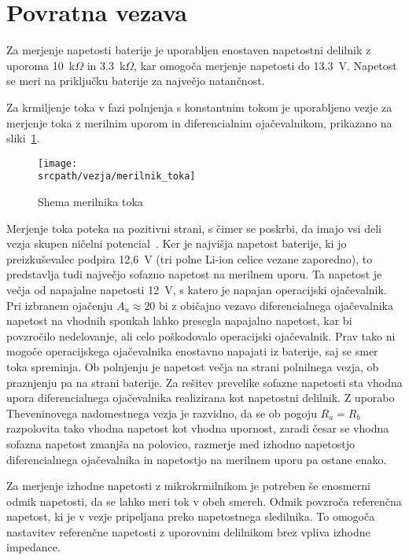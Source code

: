 \documentclass[a4paper,twoside,openright,12pt,slovene]{book}
\newcommand{\srcpath}{res_dark}
\newcommand{\srcpath}{res}
\begin{document}
\section{Povratna vezava} \label{sec:povratna vezava}

Za merjenje napetosti baterije je uporabljen enostaven napetostni delilnik z uporoma 10~k$\Omega$ in 3.3~k$\Omega$, kar omogoča merjenje napetosti do 13.3~V.\@
Napetost se meri na priključku baterije za največjo natančnost.

Za krmiljenje toka v fazi polnjenja s konstantnim tokom je uporabljeno vezje za merjenje toka z merilnim uporom in diferencialnim ojačevalnikom, prikazano na sliki~\ref{fig:merilnik_toka}.
\begin{figure}[H]
    \centering
    \texttt{[image: \\srcpath/vezja/merilnik\_toka]}
    \caption{\label{fig:merilnik_toka} Shema merilnika toka}
\end{figure}

Merjenje toka poteka na pozitivni strani, s čimer se poskrbi, da imajo vsi deli vezja skupen ničelni potencial~\cite{claycomb_using_2019}.
Ker je najvišja napetost baterije, ki jo preizkuševalec podpira 12,6~V (tri polne Li-ion celice vezane zaporedno), to predstavlja tudi največjo sofazno napetost na merilnem uporu.
Ta napetost je večja od napajalne napetosti 12~V, s katero je napajan operacijski ojačevalnik.
Pri izbranem ojačenju $A_u \approx 20$ bi z običajno vezavo diferencialnega ojačevalnika napetost na vhodnih sponkah
lahko presegla napajalno napetost, kar bi povzročilo nedelovanje, ali celo poškodovalo operacijski ojačevalnik.
Prav tako ni mogoče operacijskega ojačevalnika enostavno napajati iz baterije, saj se smer toka spreminja.
Ob polnjenju je napetost večja na strani polnilnega vezja, ob praznjenju pa na strani baterije.
Za rešitev prevelike sofazne napetosti sta vhodna upora diferencialnega ojačevalnika realizirana kot napetostni delilnik.
Z uporabo Theveninovega nadomestnega vezja je razvidno, da se ob pogoju $R_a=R_b$ razpolovita tako vhodna napetost kot vhodna upornost,
zaradi česar se vhodna sofazna napetost zmanjša na polovico, razmerje med izhodno napetostjo diferencialnega ojačevalnika in napetostjo na merilnem uporu pa ostane enako.

Za merjenje izhodne napetosti z mikrokrmilnikom je potreben še enosmerni odmik napetosti, da se lahko meri tok v obeh smereh.
Odmik povzroča referenčna napetost, ki je v vezje pripeljana preko napetostnega sledilnika.
To omogoča nastavitev referenčne napetosti z uporovnim delilnikom brez vpliva izhodne impedance.
\end{document}
